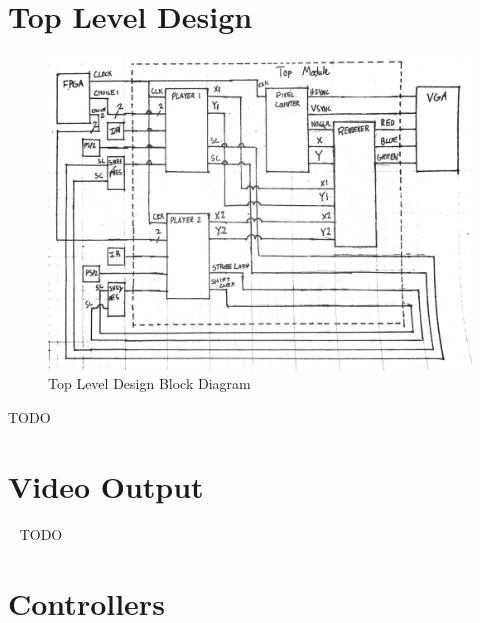 \documentclass[]{article}
\begin{document}
\section{Top Level Design}
\begin{figure}[H]\centering
    \includegraphics[width=\linewidth]{figures/Top_Block.jpg}
    \caption{Top Level Design Block Diagram} 
    \label{fig:TopLevelDesign}
\end{figure}
TODO

\section{Video Output}\
\label{vidoutput}
TODO

\section{Controllers}
\end{document}
